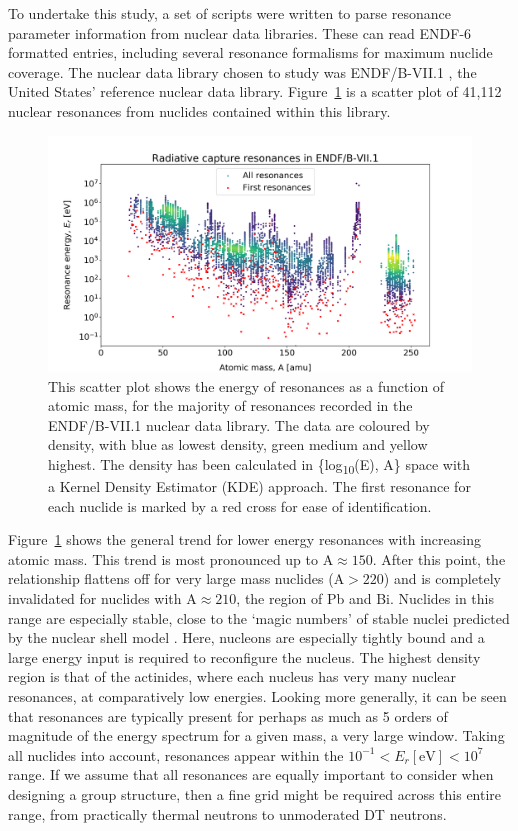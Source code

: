 To undertake this study, a set of scripts were written to parse resonance parameter information from nuclear data libraries. These can read ENDF-6 formatted entries, including several resonance formalisms for maximum nuclide coverage. The nuclear data library chosen to study was ENDF/B-VII.1 \cite{Chadwick2011}, the United States' reference nuclear data library. Figure~\ref{fig:res_energy_mass} is a scatter plot of 41,112 nuclear resonances from nuclides contained within this library. 

\begin{figure}[H]
  \centering
  \includegraphics[width=\linewidth]{resonance_energy_atomic_mass}
  \caption[Nuclear resonance energies as a function of atomic mass.]{This scatter plot shows the energy of resonances as a function of atomic mass, for the majority of resonances recorded in the ENDF/B-VII.1 nuclear data library. The data are coloured by density, with blue as lowest density, green medium and yellow highest. The density has been calculated in \{log\textsubscript{10}(E), A\} space with a Kernel Density Estimator (KDE) approach. The first resonance for each nuclide is marked by a red cross for ease of identification.}
  \label{fig:res_energy_mass}
\end{figure}

Figure~\ref{fig:res_energy_mass} shows the general trend for lower energy resonances with increasing atomic mass. This trend is most pronounced up to $\mathrm{A} \approx 150$. After this point, the relationship flattens off for very large mass nuclides ($\mathrm{A} > 220$) and is completely invalidated for nuclides with $\mathrm{A} \approx 210$, the region of Pb and Bi. Nuclides in this range are especially stable, close to the `magic numbers' of stable nuclei predicted by the nuclear shell model \cite{Stone1997}. Here, nucleons are especially tightly bound and a large energy input is required to reconfigure the nucleus. The highest density region is that of the actinides, where each nucleus has very many nuclear resonances, at comparatively low energies. Looking more generally, it can be seen that resonances are typically present for perhaps as much as 5 orders of magnitude of the energy spectrum for a given mass, a very large window. Taking all nuclides into account, resonances appear within the $10^{-1} < E_{r}\mathrm{[eV]} < 10^{7}$ range. If we assume that all resonances are equally important to consider when designing a group structure, then a fine grid might be required across this entire range, from practically thermal neutrons to unmoderated DT neutrons. 

